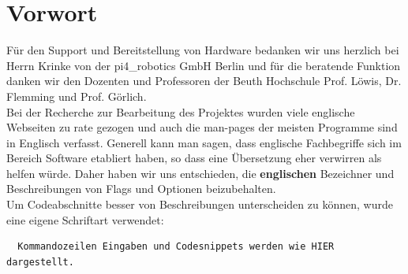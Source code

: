 \section{Vorwort}
Für den Support und Bereitstellung von Hardware bedanken wir uns herzlich bei Herrn Krinke von der pi4\_robotics GmbH Berlin und für die beratende Funktion danken wir den Dozenten und Professoren der Beuth Hochschule Prof. Löwis, Dr. Flemming und Prof. Görlich.\\
Bei der Recherche zur Bearbeitung des Projektes wurden viele englische Webseiten zu rate gezogen und auch die man-pages der meisten Programme sind in Englisch verfasst. Generell kann man sagen, dass englische Fachbegriffe sich im Bereich Software etabliert haben, so dass eine Übersetzung eher verwirren als helfen würde. Daher haben wir uns entschieden, die \textbf{englischen} Bezeichner und Beschreibungen von Flags und Optionen beizubehalten.\\
Um Codeabschnitte besser von Beschreibungen unterscheiden zu können, wurde eine eigene Schriftart verwendet:
\begin{verbatim}
  Kommandozeilen Eingaben und Codesnippets werden wie HIER dargestellt.
\end{verbatim}

